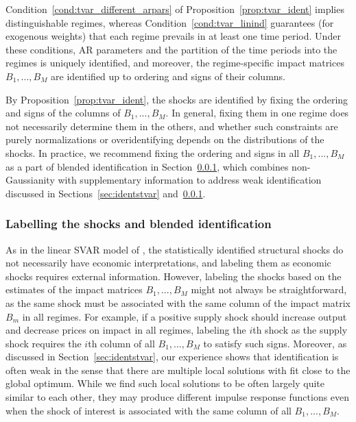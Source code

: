 \documentclass[nojss]{jss}
\begin{document}
Condition~\ref{cond:tvar_different_arpars} of Proposition~\ref{prop:tvar_ident} implies distinguishable regimes, whereas Condition~\ref{cond:tvar_linind} guarantees (for exogenous weights) that each regime prevails in at least one time period. Under these conditions, AR parameters and the partition of the time periods into the regimes is uniquely identified, and moreover, the regime-specific impact matrices $B_1,...,B_M$ are identified up to ordering and signs of their columns.

By Proposition~\ref{prop:tvar_ident}, the shocks are identified by fixing the ordering and signs of the columns of $B_1,...,B_M$. In general, fixing them in one regime does not necessarily determine them in the others, and whether such constraints are purely normalizations or overidentifying depends on the distributions of the shocks. In practice, we recommend fixing the ordering and signs in all $B_1,...,B_M$ as a part of blended identification in Section~\ref{sec:labellingshocks}, which combines non-Gaussianity with supplementary information to address weak identification discussed in Sections~\ref{sec:identstvar} and~\ref{sec:labellingshocks}.


\subsubsection{Labelling the shocks and blended identification}\label{sec:labellingshocks}

As in the linear SVAR model of \cite{Lanne+Meitz+Saikkonen:2017}, the statistically identified structural shocks do not necessarily have economic interpretations, and labeling them as economic shocks requires external information. However, labeling the shocks based on the estimates of the impact matrices $B_1,...,B_M$ might not always be straightforward, as the same shock must be associated with the same column of the impact matrix $B_m$ in all regimes. For example, if a positive supply shock should increase output and decrease prices on impact in all regimes, labeling the $i$th shock as the supply shock requires the $i$th column of all $B_1,...,B_M$ to satisfy such signs. Moreover, as discussed in Section~\ref{sec:identstvar}, our experience shows that identification is often weak in the sense that there are multiple local solutions with fit close to the global optimum. While we find such local solutions to be often largely quite similar to each other, they may produce different impulse response functions even when the shock of interest is associated with the same column of all $B_1,...,B_M$.
\end{document}
